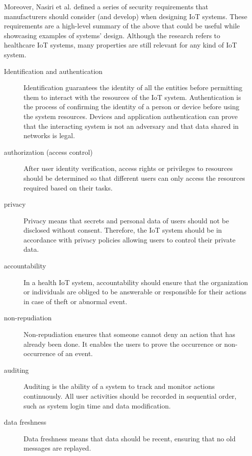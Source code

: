     
    Moreover, Nasiri et al. \cite{nasiri2019security} defined a series of security requirements that manufacturers should consider (and develop) when designing IoT systems. These requirements are a high-level summary of the above that could be useful while showcasing examples of systems’ design. Although the research refers to healthcare IoT systems, many properties are still relevant for any kind of IoT system.
    
    \begin{description}
        \item[Identification and authentication] Identification guarantees the identity of all the entities before permitting them to interact with the resources of the IoT system. Authentication is the process of confirming the identity of a person or device before using the system resources. Devices and application authentication can prove that the interacting system is not an adversary and that data shared in networks is legal.
        
        \item[authorization (access control)] After user identity verification, access rights or privileges to resources should be determined so that different users can only access the resources required based on their tasks.

        \item[privacy] Privacy means that secrets and personal data of users should not be disclosed without consent. Therefore, the IoT system should be in accordance with privacy policies allowing users to control their private data.

        \item[accountability] In a health IoT system, accountability should ensure that the organization or individuals are obliged to be answerable or responsible for their actions in case of theft or abnormal event.

        \item[non-repudiation] Non-repudiation ensures that someone cannot deny an action that has already been done. It enables the users to prove the occurrence or non-occurrence of an event.

        \item[auditing] Auditing is the ability of a system to track and monitor actions continuously. All user activities should be recorded in sequential order, such as system login time and data modification.
        
        \item[data freshness] Data freshness means that data should be recent, ensuring that no old messages are replayed.

        

    \end{description}
    